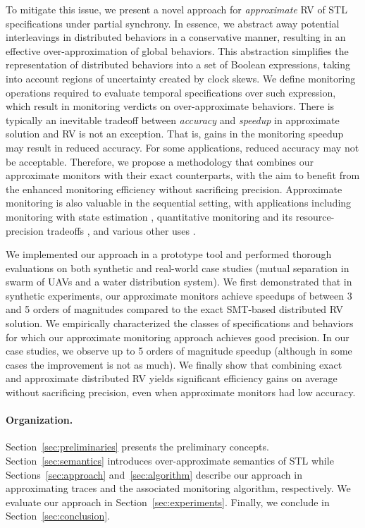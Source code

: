 To mitigate this issue, we present a novel approach for \emph{approximate} RV of STL 
specifications under partial synchrony.
%
In essence, we abstract away potential interleavings in distributed behaviors in a conservative 
manner, resulting in an effective over-approximation of global behaviors.
%
This abstraction simplifies the representation of distributed behaviors into a set of Boolean 
expressions, taking into account regions of uncertainty created by clock skews.
%
We define monitoring operations required to evaluate temporal specifications over such expression, 
which result in monitoring verdicts on over-approximate behaviors.
%
There is typically an inevitable tradeoff between {\em accuracy} and {\em speedup} in approximate 
solution and  RV is not an exception.
%
That is, gains in the monitoring speedup may result in reduced accuracy.
%
For some applications, reduced accuracy may not be acceptable.
%
Therefore, we propose a methodology that combines our approximate monitors with their exact 
counterparts, with the aim to benefit from the enhanced monitoring efficiency without sacrificing 
precision.
%
Approximate monitoring is also valuable in the sequential setting, with applications including
monitoring with state estimation \cite{StollerBSGHSZ11,BartocciG13},
quantitative monitoring and its resource-precision tradeoffs \cite{HenzingerS21,HenzingerMS22,HenzingerMS23},
and various other uses \cite{AlechinaDL14,AcetoAFIL21}.



We implemented our approach in a prototype tool and performed thorough evaluations on both 
synthetic and real-world case studies (mutual separation in swarm of UAVs and a water distribution 
system).
%
We first demonstrated that in synthetic experiments, our approximate monitors achieve 
speedups of between 3 and 5 orders of magnitudes compared to the exact SMT-based 
distributed RV solution.
%
We empirically characterized the classes of specifications and behaviors for which our approximate 
monitoring approach achieves good precision.
%
In our case studies, we observe up to 5 orders of magnitude speedup (although in some cases the 
improvement is not as much).
%
We finally show that combining exact and approximate distributed RV yields significant efficiency gains on average without sacrificing precision, even when approximate monitors had low accuracy.

\paragraph{Organization.}
Section~\ref{sec:preliminaries} presents the preliminary concepts.
%
Section~\ref{sec:semantics} introduces over-approximate semantics of STL while 
Sections~\ref{sec:approach} and~\ref{sec:algorithm} describe our approach in approximating traces 
and the associated monitoring algorithm, respectively.
%
We evaluate our approach in Section~\ref{sec:experiments}. Finally, we conclude in 
Section~\ref{sec:conclusion}.